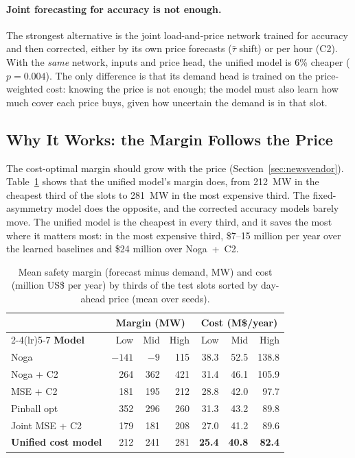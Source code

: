 \paragraph*{Joint forecasting for accuracy is not enough.}  The strongest
alternative is the joint load-and-price network trained for accuracy and then
corrected, either by its own price forecasts ($\hat\tau$ shift) or per hour
(C2).  With the \emph{same} network, inputs and price head, the unified model
is 6\% cheaper ($p=0.004$).  The only difference is that its demand head is
trained on the price-weighted cost: knowing the price is not enough; the
model must also learn how much cover each price buys, given how uncertain the
demand is in that slot.

\subsection{Why It Works: the Margin Follows the Price}
\label{sec:mechanism}

The cost-optimal margin should grow with the price
(Section~\ref{sec:newsvendor}).  Table~\ref{tab:price-thirds} shows that the
unified model's margin does, from 212~MW in the cheapest third of the slots to
281~MW in the most expensive third.  The fixed-asymmetry model does the
opposite, and the corrected accuracy models barely move.  The unified model is
the cheapest in every third, and it saves the most where it matters most: in
the most expensive third, \$7--15 million per year over the learned baselines
and \$24 million over Noga~+~C2.

\begin{table}[t]
    \centering
    \small
    \caption{Mean safety margin (forecast minus demand, MW) and cost
             (million US\$ per year) by thirds of the test slots sorted by
             day-ahead price (mean over seeds).}
    \label{tab:price-thirds}
    \begin{tabular}{lrrrrrr}
        \toprule
        & \multicolumn{3}{c}{\textbf{Margin (MW)}} &
          \multicolumn{3}{c}{\textbf{Cost (M\$/year)}} \\
        \cmidrule(lr){2-4}\cmidrule(lr){5-7}
        \textbf{Model} & Low & Mid & High & Low & Mid & High \\
        \midrule
        Noga                & $-141$ & $-9$ & 115 & 38.3 & 52.5 & 138.8 \\
        Noga + C2           & 264 & 362 & 421 & 31.4 & 46.1 & 105.9 \\
        MSE + C2            & 181 & 195 & 212 & 28.8 & 42.0 &  97.7 \\
        Pinball opt         & 352 & 296 & 260 & 31.3 & 43.2 &  89.8 \\
        Joint MSE + C2      & 179 & 181 & 208 & 27.0 & 41.2 &  89.6 \\
        \textbf{Unified cost model} & 212 & 241 & 281 & \textbf{25.4} & \textbf{40.8} & \textbf{82.4} \\
        \bottomrule
    \end{tabular}
\end{table}

